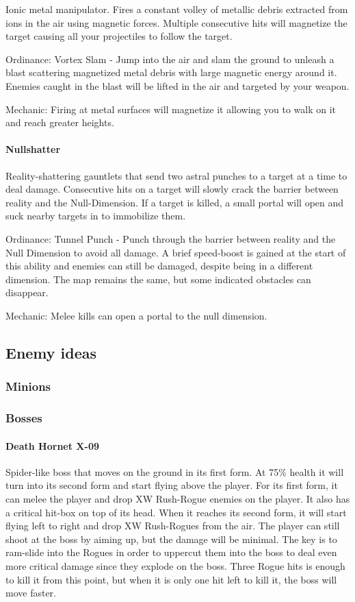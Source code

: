 \documentclass[../Main.tex]{subfiles}
\begin{document}
Ionic metal manipulator. Fires a constant volley of metallic debris extracted from ions in the air using magnetic forces. Multiple consecutive hits will magnetize the target causing all your projectiles to follow the target.

Ordinance: Vortex Slam - Jump into the air and slam the ground to unleash a blast scattering magnetized metal debris with large magnetic energy around it. Enemies caught in the blast will be lifted in the air and targeted by your weapon.

Mechanic: Firing at metal surfaces will magnetize it allowing you to walk on it and reach greater heights. 

\paragraph{Nullshatter}

Reality-shattering gauntlets that send two astral punches to a target at a time to deal damage. Consecutive hits on a target will slowly crack the barrier between reality and the Null-Dimension. If a target is killed, a small portal will open and suck nearby targets in to immobilize them.

Ordinance: Tunnel Punch - Punch through the barrier between reality and the Null Dimension to avoid all damage. A brief speed-boost is gained at the start of this ability and enemies can still be damaged, despite being in a different dimension. The map remains the same, but some indicated obstacles can disappear.

Mechanic: Melee kills can open a portal to the null dimension. 

\subsection{Enemy ideas}

\subsubsection{Minions}

\subsubsection{Bosses}

\paragraph{Death Hornet X-09}

Spider-like boss that moves on the ground in its first form. At 75\% health it will turn into its second form and start flying above the player. For its first form, it can melee the player and drop XW Rush-Rogue enemies on the player. It also has a critical hit-box on top of its head. When it reaches its second form, it will start flying left to right and drop XW Rush-Rogues from the air. The player can still shoot at the boss by aiming up, but the damage will be minimal. The key is to ram-slide into the Rogues in order to uppercut them into the boss to deal even more critical damage since they explode on the boss. Three Rogue hits is enough to kill it from this point, but when it is only one hit left to kill it, the boss will move faster. 
\end{document}
